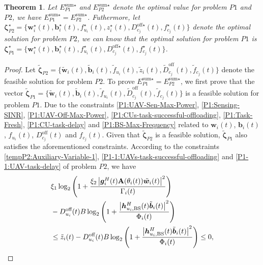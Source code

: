 \documentclass[10pt,journal,compsoc]{IEEEtran}
\newtheorem{theorem}{ \textbf{Theorem}}
\newtheorem*{proof}{Proof}
\begin{document}
\begin{theorem}\label{theorem:P1-equals-P2}
    Let $E_{P1}^{\text{sum} \star}$ and $E_{P2}^{\text{sum} \star}$ 
    denote the optimal value for problem $P1$ and $P2$, we have $E_{P1}^{\text{sum} \star} = E_{P2}^{\text{sum} \star}$.
    Futhermore, let ${\bm{\zeta}}^{\star}_{P2} = \big\{{\bm{w}}^{\star}_{i}(t), {\bm{b}}^{\star}_{i}(t), {f}^{\star}_{u_{i}}(t), z^{\star}_{i}(t), {D}_{c_{j}}^{\text{off}\star}(t), {f}^{\star}_{c_{j}}(t)\big\}$ 
    denote the optimal solution for problem $P2$, we can know that the optimal solution for problem $P1$
    is ${\bm{\zeta}}^{\star}_{P1} = \big\{{\bm{w}}^{\star}_{i}(t), {\bm{b}}^{\star}_{i}(t), {f}^{\star}_{u_{i}}(t), {D}_{c_{j}}^{\text{off}\star}(t), {f}^{\star}_{c_{j}}(t)\big\}$.
\end{theorem}
\begin{proof}
    Let $\tilde{\bm{\zeta}}_{P2} = \big\{\tilde{\bm{w}}_{i}(t), \tilde{\bm{b}}_{i}(t), \tilde{f}_{u_{i}}(t), \tilde{z}_{i}(t), \tilde{D}_{c_{j}}^{\text{off}}(t), \tilde{f}_{c_{j}}(t)\big\}$ denote the feasible solution for problem $P2$.
    To prove $E_{P1}^{\text{sum} \star} = E_{P2}^{\text{sum} \star}$, we first prove that the vector $\tilde{\bm{\zeta}}_{P1} = \big\{\tilde{\bm{w}}_{i}(t), \tilde{\bm{b}}_{i}(t), \tilde{f}_{u_{i}}(t), \tilde{D}_{c_{j}}^{\text{off}}(t), \tilde{f}_{c_{j}}(t)\big\}$ is a feasible solution for problem $P1$.
    Due to the constraints \eqref{P1:UAV-Sen-Max-Power}, \eqref{P1:Sensing-SINR}, \eqref{P1:UAV-Off-Max-Power}, \eqref{P1:CUs-task-successful-offloading}, \eqref{P1:Task-Fresh}, \eqref{P1:CU-task-delay} and \eqref{P1:BS-Max-Frequency} related to ${\bm{w}}_{i}(t)$, ${\bm{b}}_{i}(t)$, ${f}_{u_{i}}(t)$, ${D}_{c_{j}}^{\text{off}}(t)$ and ${f}_{c_{j}}(t)$.
    Given that $\tilde{\bm{\zeta}}_{P2}$ is a feasible solution, $\tilde{\bm{\zeta}}_{P1}$ also satisfies the aforementioned constraints. 
    According to the constraints \eqref{tempP2:Auxiliary-Variable-1}, \eqref{P1-1:UAVs-task-successful-offloading} and \eqref{P1-1:UAV-task-delay} of problem $P2$, we have
    \begin{align}\label{P1-1-Convert-P1-Proof-1}
        & \xi_{1} \log_2 \Bigg(1 + \frac{\xi_{2} \left|\bm{g}^{H}_{i}(t)\mathbf{A}(\theta_{i}(t)) \tilde{\bm{w}}_{i}(t)\right|^{2}}{\Gamma_{i}(t)}\Bigg) \notag \\
        & - D_{u_{i}}^{\text{off}}(t)B \log_2 \Bigg( 1  + \frac{\left|\bm{h}^{H}_{u_{i}, \text{BS}}(t)\tilde{\bm{b}}_{i}(t)\right|^{2}}{\Phi_i(t)} \Bigg) \notag \\
        &  \le \tilde{z}_{i}(t) -  D_{u_{i}}^{\text{off}}(t) B\log_2 \Bigg( 1 + \frac{\left|\bm{h}^{H}_{u_{i}, \text{BS}}(t)\tilde{\bm{b}}_{i}(t)\right|^{2}}{\Phi_i(t)} \Bigg) \le 0,

\end{align}
\end{proof}
\end{document}
